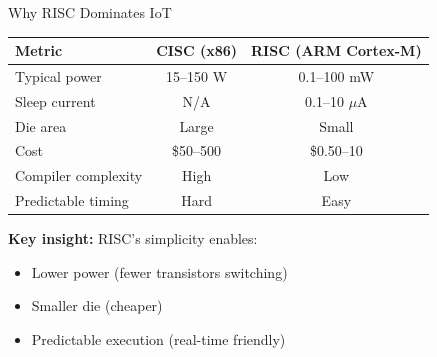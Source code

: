 \documentclass[aspectratio=169,11pt]{beamer}
\begin{document}
\begin{frame}{Why RISC Dominates IoT}
    \begin{table}
        \centering
        \begin{tabular}{@{}lcc@{}}
            \toprule
            \textbf{Metric} & \textbf{CISC (x86)} & \textbf{RISC (ARM Cortex-M)} \\
            \midrule
            Typical power & 15--150 W & 0.1--100 mW \\
            Sleep current & N/A & 0.1--10 $\mu$A \\
            Die area & Large & Small \\
            Cost & \$50--500 & \$0.50--10 \\
            Compiler complexity & High & Low \\
            Predictable timing & Hard & Easy \\
            \bottomrule
        \end{tabular}
    \end{table}
    
    \vspace{0.3cm}
    \textbf{Key insight:} RISC's simplicity enables:
    \begin{itemize}
        \item Lower power (fewer transistors switching)
        \item Smaller die (cheaper)
        \item Predictable execution (real-time friendly)
    \end{itemize}
\end{frame}
\end{document}
